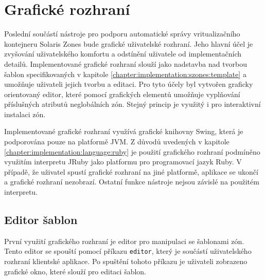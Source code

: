\section{Grafické rozhraní}
\label{chapter:implementation:gui}
Poslední součástí nástroje pro podporu automatické správy vritualizačního kontejneru Solaris Zones bude grafické uživatelské 
rozhraní. Jeho hlavní účel je zvyšování uživatelského komfortu a odstínění uživatele  od implementačních detailů. 
Implementované grafické rozhraní slouží jako nadstavba nad tvorbou šablon specifikovaných v kapitole \ref{chapter:implementation:szones:template}
a umožňuje uživateli jejich tvorbu a editaci. Pro tyto účely byl vytvořen graficky orientovaný editor, které pomocí grafických
elementů umožňuje vyplňování příslušných atributů neglobálních zón. Stejný princip je využitý i pro interaktivní instalaci 
zón.

Implementované grafické rozhraní využívá grafické knihovny Swing, která je podporována pouze na platformě JVM. Z důvodů uvedených
v kapitole \ref{chapter:implementation:language:ruby} je použití grafického rozhraní podmíněno využitím interpretu JRuby jako
platformu pro programovací jazyk Ruby. V případě, že uživatel spustí grafické rozhraní na jiné platformě, aplikace se ukončí
a grafické rozhraní nezobrazí. Ostatní funkce nástroje nejsou závislé na použitém interpretu.
\subsection{Editor šablon}
\label{chapter:implementation:gui:editor}
První využití grafického rozhraní je editor pro manipulaci se šablonami zón. Tento editor se spouští pomocí příkazu \verb|editor|,
který je součástí uživatelského rozhraní klientské aplikace. Po spuštění tohoto příkazu je uživateli zobrazeno grafické okno,
které slouží pro editaci šablon.

